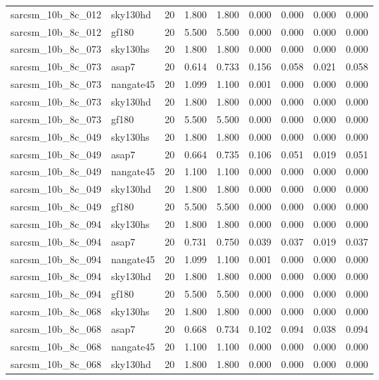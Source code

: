 \begin{tabular}{llrrrrrrr}
sarcsm\_10b\_8c\_012 & sky130hd & 20 & 1.800 & 1.800 & 0.000 & 0.000 & 0.000 & 0.000 \\
sarcsm\_10b\_8c\_012 & gf180 & 20 & 5.500 & 5.500 & 0.000 & 0.000 & 0.000 & 0.000 \\
sarcsm\_10b\_8c\_073 & sky130hs & 20 & 1.800 & 1.800 & 0.000 & 0.000 & 0.000 & 0.000 \\
sarcsm\_10b\_8c\_073 & asap7 & 20 & 0.614 & 0.733 & 0.156 & 0.058 & 0.021 & 0.058 \\
sarcsm\_10b\_8c\_073 & nangate45 & 20 & 1.099 & 1.100 & 0.001 & 0.000 & 0.000 & 0.000 \\
sarcsm\_10b\_8c\_073 & sky130hd & 20 & 1.800 & 1.800 & 0.000 & 0.000 & 0.000 & 0.000 \\
sarcsm\_10b\_8c\_073 & gf180 & 20 & 5.500 & 5.500 & 0.000 & 0.000 & 0.000 & 0.000 \\
sarcsm\_10b\_8c\_049 & sky130hs & 20 & 1.800 & 1.800 & 0.000 & 0.000 & 0.000 & 0.000 \\
sarcsm\_10b\_8c\_049 & asap7 & 20 & 0.664 & 0.735 & 0.106 & 0.051 & 0.019 & 0.051 \\
sarcsm\_10b\_8c\_049 & nangate45 & 20 & 1.100 & 1.100 & 0.000 & 0.000 & 0.000 & 0.000 \\
sarcsm\_10b\_8c\_049 & sky130hd & 20 & 1.800 & 1.800 & 0.000 & 0.000 & 0.000 & 0.000 \\
sarcsm\_10b\_8c\_049 & gf180 & 20 & 5.500 & 5.500 & 0.000 & 0.000 & 0.000 & 0.000 \\
sarcsm\_10b\_8c\_094 & sky130hs & 20 & 1.800 & 1.800 & 0.000 & 0.000 & 0.000 & 0.000 \\
sarcsm\_10b\_8c\_094 & asap7 & 20 & 0.731 & 0.750 & 0.039 & 0.037 & 0.019 & 0.037 \\
sarcsm\_10b\_8c\_094 & nangate45 & 20 & 1.099 & 1.100 & 0.001 & 0.000 & 0.000 & 0.000 \\
sarcsm\_10b\_8c\_094 & sky130hd & 20 & 1.800 & 1.800 & 0.000 & 0.000 & 0.000 & 0.000 \\
sarcsm\_10b\_8c\_094 & gf180 & 20 & 5.500 & 5.500 & 0.000 & 0.000 & 0.000 & 0.000 \\
sarcsm\_10b\_8c\_068 & sky130hs & 20 & 1.800 & 1.800 & 0.000 & 0.000 & 0.000 & 0.000 \\
sarcsm\_10b\_8c\_068 & asap7 & 20 & 0.668 & 0.734 & 0.102 & 0.094 & 0.038 & 0.094 \\
sarcsm\_10b\_8c\_068 & nangate45 & 20 & 1.100 & 1.100 & 0.000 & 0.000 & 0.000 & 0.000 \\
sarcsm\_10b\_8c\_068 & sky130hd & 20 & 1.800 & 1.800 & 0.000 & 0.000 & 0.000 & 0.000 \\

\end{tabular}
